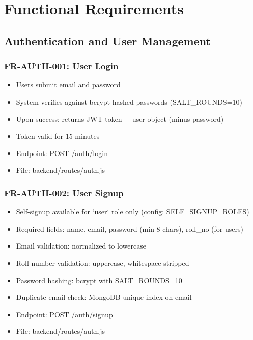 \documentclass[12pt,a4paper]{article}
\begin{document}
\section{Functional Requirements}

\subsection{Authentication and User Management}

\subsubsection{FR-AUTH-001: User Login}
\begin{itemize}
  \item Users submit email and password
  \item System verifies against bcrypt hashed passwords (SALT\_ROUNDS=10)
  \item Upon success: returns JWT token + user object (minus password)
  \item Token valid for 15 minutes
  \item Endpoint: POST /auth/login
  \item File: backend/routes/auth.js
\end{itemize}

\subsubsection{FR-AUTH-002: User Signup}
\begin{itemize}
  \item Self-signup available for `user` role only (config: SELF\_SIGNUP\_ROLES)
  \item Required fields: name, email, password (min 8 chars), roll\_no (for users)
  \item Email validation: normalized to lowercase
  \item Roll number validation: uppercase, whitespace stripped
  \item Password hashing: bcrypt with SALT\_ROUNDS=10
  \item Duplicate email check: MongoDB unique index on email
  \item Endpoint: POST /auth/signup
  \item File: backend/routes/auth.js
\end{itemize}
\end{document}
